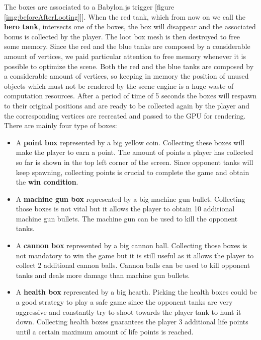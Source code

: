 \documentclass[14pt]{article}
\begin{document}
The boxes are associated to a Babylon.js trigger [figure \ref{img:beforeAfterLooting}]]. When the red tank, which from now on we call the \textbf{hero tank}, intersects one of the boxes, the box will disappear and the associated bonus is collected by the player. The loot box mesh is then destroyed to free some memory. Since the red and the blue tanks are composed by a considerable amount of vertices, we paid particular attention to free memory whenever it is possible to optimize the scene. Both the red and the blue tanks are composed by a considerable amount of vertices, so keeping in memory the position of unused objects which must not be rendered by the scene engine is a huge waste of computation resources. After a period of time of 5 seconds the boxes will respawn to their original positions and are ready to be collected again by the player and the corresponding vertices are recreated and passed to the GPU for rendering. \\
There are mainly four type of boxes:
\begin{itemize}


\item A \textbf{point box} represented by a big yellow coin. Collecting these boxes will make the player to earn a point. The amount of points a player has collected so far is shown in the top left corner of the screen. Since opponent tanks will keep spawning, collecting points is crucial to complete the game and obtain the \textbf{win condition}. 
\item A \textbf{machine gun box} represented by a big machine gun bullet. Collecting those boxes is not vital but it allows the player to obtain 10 additional machine gun bullets. The machine gun can be used to kill the opponent tanks.

\item A \textbf{cannon box} represented by a big cannon ball. Collecting those boxes is not mandatory to win the game but it is still useful as it allows the player to collect 2 additional cannon balls. Cannon balls can be used to kill opponent tanks and deals more damage than machine gun bullets.

\item A \textbf{health box} represented by a big hearth. Picking the health boxes could be a good strategy to play a safe game since the opponent tanks are very aggressive and constantly try to shoot towards the player tank to hunt it down. Collecting health boxes guarantees the player 3 additional life points until a certain maximum amount of life points is reached.

\end{itemize}
\end{document}
